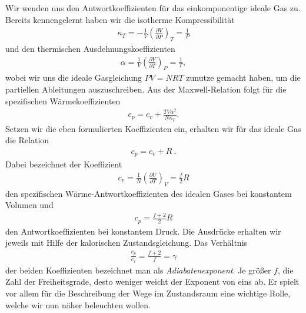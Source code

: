 Wir wenden uns den Antwortkoeffizienten für das einkomponentige ideale Gas zu. Bereits kennengelernt haben wir die isotherme Kompressibilität 
\begin{align*}
    \kappa_T=-\frac{1}{V}\left(\frac{\partial V}{\partial P}\right)_T=\frac{1}{P}
\end{align*} 
und den thermischen Ausdehnungskoeffizienten 
\begin{align*}
    \alpha=\frac{1}{V}\left(\frac{\partial V}{\partial T}\right)_P=\frac{1}{T},
\end{align*}
wobei wir uns die ideale Gasgleichung $PV=NRT$ zunutze gemacht haben, um die partiellen Ableitungen auszuschreiben.
Aus der Maxwell-Relation folgt für die spezifischen Wärmekoeffizienten 
\begin{align*}
    c_p=c_v+\frac{TV\alpha^2}{N\kappa_T}.
\end{align*}
Setzen wir die eben formulierten Koeffizienten ein, erhalten wir für das ideale Gas die Relation 
\begin{align*}
    \boxed{c_p=c_v+R}\:.
\end{align*}
Dabei bezeichnet der Koeffizient 
\begin{align*}
    c_v=\frac{1}{N}\left(\frac{\partial U}{\partial T}\right)_V=\frac{f}{2}R
\end{align*}
den spezifischen Wärme-Antwortkoeffizienten des idealen Gases bei konstantem Volumen und 
\begin{align*}
    c_p=\frac{f+2}{2}R
\end{align*}
den Antwortkoeffizienten bei konstantem Druck. Die Ausdrücke erhalten wir jeweils mit Hilfe der kalorischen Zustandsgleichung.
Das Verhältnis 
\begin{align*}
    \frac{c_p}{c_v}=\frac{f+2}{f}=\gamma
\end{align*}
der beiden Koeffizienten bezeichnet man als \emph{Adiabatenexponent}.
Je größer $f$, die Zahl der Freiheitsgrade, desto weniger weicht der Exponent von eins ab.
Er spielt vor allem für die Beschreibung der Wege im Zustandsraum eine wichtige Rolle, welche wir nun näher beleuchten wollen.

